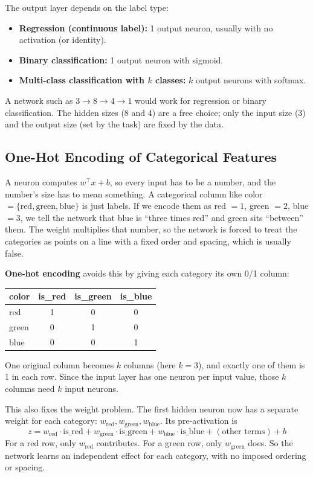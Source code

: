 The output layer depends on the label type:
\begin{itemize}
    \item \textbf{Regression (continuous label):} 1 output neuron, usually with no activation (or identity).
    \item \textbf{Binary classification:} 1 output neuron with sigmoid.
    \item \textbf{Multi-class classification with $k$ classes:} $k$ output neurons with softmax.
\end{itemize}

A network such as $3 \to 8 \to 4 \to 1$ would work for regression or binary classification. The hidden sizes (8 and 4) are a free choice; only the input size (3) and the output size (set by the task) are fixed by the data.

\subsection*{One-Hot Encoding of Categorical Features}

A neuron computes $w^\top x + b$, so every input has to be a number, and the number's size has to mean something. A categorical column like color $= \{\text{red}, \text{green}, \text{blue}\}$ is just labels. If we encode them as red $= 1$, green $= 2$, blue $= 3$, we tell the network that blue is ``three times red'' and green sits ``between'' them. The weight multiplies that number, so the network is forced to treat the categories as points on a line with a fixed order and spacing, which is usually false.

\textbf{One-hot encoding} avoids this by giving each category its own 0/1 column:

\begin{center}
\begin{tabular}{lccc}
\toprule
color & is\_red & is\_green & is\_blue \\
\midrule
red   & 1 & 0 & 0 \\
green & 0 & 1 & 0 \\
blue  & 0 & 0 & 1 \\
\bottomrule
\end{tabular}
\end{center}

One original column becomes $k$ columns (here $k = 3$), and exactly one of them is 1 in each row. Since the input layer has one neuron per input value, those $k$ columns need $k$ input neurons.

This also fixes the weight problem. The first hidden neuron now has a separate weight for each category: $w_{\text{red}}, w_{\text{green}}, w_{\text{blue}}$. Its pre-activation is
\[
z = w_{\text{red}} \cdot \text{is\_red} + w_{\text{green}} \cdot \text{is\_green} + w_{\text{blue}} \cdot \text{is\_blue} + (\text{other terms}) + b
\]
For a red row, only $w_{\text{red}}$ contributes. For a green row, only $w_{\text{green}}$ does. So the network learns an independent effect for each category, with no imposed ordering or spacing.

